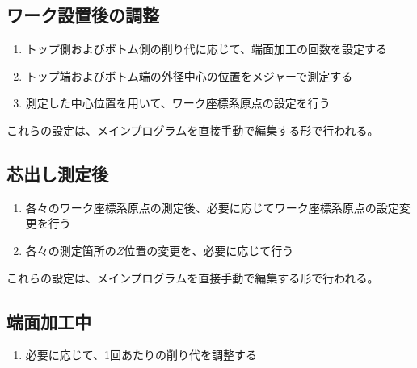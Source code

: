 \subsection{ワーク設置後の調整}
\begin{enumerate}
\item トップ側およびボトム側の削り代に応じて、端面加工の回数を設定する
\item トップ端およびボトム端の外径中心の位置をメジャーで測定する
\item 測定した中心位置を用いて、ワーク座標系原点の設定を行う
\end{enumerate}
これらの設定は、メインプログラムを直接手動で編集する形で行われる。



\clearpage


\subsection{芯出し測定後}
\begin{enumerate}
\item 各々のワーク座標系原点の測定後、必要に応じてワーク座標系原点の設定変更を行う
\item 各々の測定箇所の$Z$位置の変更を、必要に応じて行う
\end{enumerate}
これらの設定は、メインプログラムを直接手動で編集する形で行われる。


\subsection{端面加工中}
\begin{enumerate}
\item 必要に応じて、1回あたりの削り代を調整する
\end{enumerate}


